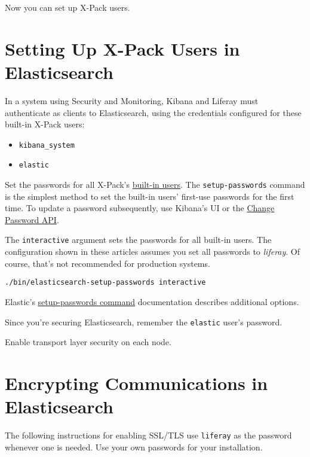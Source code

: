 Now you can set up X-Pack users.

\section{Setting Up X-Pack Users in
Elasticsearch}\label{setting-up-x-pack-users-in-elasticsearch}

In a system using Security and Monitoring, Kibana and Liferay must
authenticate as clients to Elasticsearch, using the credentials
configured for these built-in X-Pack users:

\begin{itemize}
\tightlist
\item
  \texttt{kibana\_system}
\item
  \texttt{elastic}
\end{itemize}

Set the passwords for all X-Pack's
\href{https://www.elastic.co/guide/en/x-pack/6.5/setting-up-authentication.html\#built-in-users}{built-in
users}. The \texttt{setup-passwords} command is the simplest method to
set the built-in users' first-use passwords for the first time. To
update a password subsequently, use Kibana's UI or the
\href{https://www.elastic.co/guide/en/elasticsearch/reference/6.5/security-api-change-password.html}{Change
Password API}.

The \texttt{interactive} argument sets the passwords for all built-in
users. The configuration shown in these articles assumes you set all
passwords to \emph{liferay}. Of course, that's not recommended for
production systems.

\begin{verbatim}
./bin/elasticsearch-setup-passwords interactive
\end{verbatim}

Elastic's
\href{https://www.elastic.co/guide/en/elasticsearch/reference/6.5/setup-passwords.html}{setup-passwords
command} documentation describes additional options.

Since you're securing Elasticsearch, remember the \texttt{elastic}
user's password.

Enable transport layer security on each node.

\section{Encrypting Communications in
Elasticsearch}\label{encrypting-communications-in-elasticsearch}

The following instructions for enabling SSL/TLS use \texttt{liferay} as
the password whenever one is needed. Use your own passwords for your
installation.

